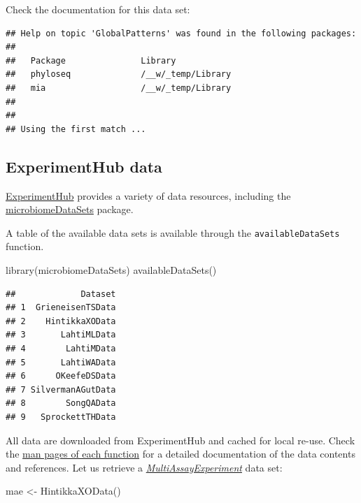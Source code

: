 \documentclass[
]{book}
\newenvironment{Shaded}{\begin{snugshade}}{\end{snugshade}}
\newcommand{\FunctionTok}[1]{\textcolor[rgb]{0.00,0.00,0.00}{#1}}
\newcommand{\NormalTok}[1]{#1}
\newcommand{\OtherTok}[1]{\textcolor[rgb]{0.56,0.35,0.01}{#1}}
\begin{document}
Check the documentation for this data set:

\begin{verbatim}
## Help on topic 'GlobalPatterns' was found in the following packages:
## 
##   Package               Library
##   phyloseq              /__w/_temp/Library
##   mia                   /__w/_temp/Library
## 
## 
## Using the first match ...
\end{verbatim}

\hypertarget{experimenthub-data}{%
\subsection{ExperimentHub data}\label{experimenthub-data}}

\href{https://bioconductor.org/packages/release/bioc/vignettes/ExperimentHub/inst/doc/ExperimentHub.html}{ExperimentHub}
provides a variety of data resources, including the
\href{https://bioconductor.org/packages/devel/data/experiment/html/microbiomeDataSets.html}{microbiomeDataSets}
package.

A table of the available data sets is available through the \texttt{availableDataSets}
function.

\begin{Shaded}
\begin{Highlighting}[]
\FunctionTok{library}\NormalTok{(microbiomeDataSets)}
\FunctionTok{availableDataSets}\NormalTok{()}
\end{Highlighting}
\end{Shaded}

\begin{verbatim}
##             Dataset
## 1  GrieneisenTSData
## 2    HintikkaXOData
## 3       LahtiMLData
## 4        LahtiMData
## 5       LahtiWAData
## 6      OKeefeDSData
## 7 SilvermanAGutData
## 8        SongQAData
## 9   SprockettTHData
\end{verbatim}

All data are downloaded from ExperimentHub and cached for local
re-use. Check the \href{https://microbiome.github.io/microbiomeDataSets/reference/index.html}{man pages of each
function}
for a detailed documentation of the data contents and references. Let
us retrieve a \emph{\href{https://bioconductor.org/packages/3.15/MultiAssayExperiment}{MultiAssayExperiment}} data set:

\begin{Shaded}
\begin{Highlighting}[]
\NormalTok{mae }\OtherTok{\textless{}{-}} \FunctionTok{HintikkaXOData}\NormalTok{()}
\end{Highlighting}
\end{Shaded}
\end{document}
